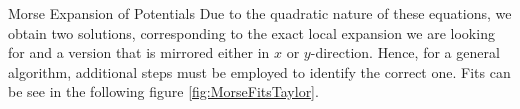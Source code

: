 \begin{chapter}{Morse Expansion of Potentials}
Due to the quadratic nature of these equations,
we obtain two solutions, corresponding to the exact local expansion we are looking for and
a version that is mirrored either in $x$ or $y$-direction. Hence, for a general algorithm, 
additional steps must be employed to identify the correct one. Fits can be see in the following figure \ref{fig:MorseFitsTaylor}.


%
%

\end{chapter}
